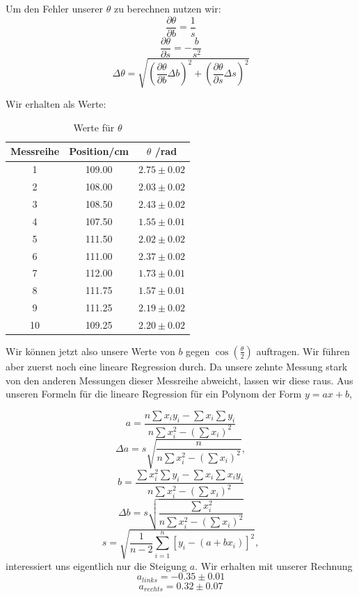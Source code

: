 \documentclass[11pt,a4paper]{article}
\begin{document}
Um den Fehler unserer $\theta$ zu berechnen nutzen wir:
\[
\frac{\partial\theta}{\partial b}=\frac{1}{s}
\]
\[
\frac{\partial\theta}{\partial s}=-\frac{b}{s^2}
\]
\[
\Delta\theta=\sqrt{\left(\frac{\partial\theta}{\partial b}\Delta b\right)^2+\left(\frac{\partial\theta}{\partial s}\Delta s\right)^2}
\]

Wir erhalten als Werte:

\begin{table}[h]
\centering
\caption{Werte f\"ur $\theta$} \vspace{11pt}
\begin{tabular}{ccc}
\toprule
\textrm{Messreihe} & \textrm{Position}/\textrm{cm} & $\theta$ /\textrm{rad} \\
\midrule 
1 & 109.00 & $2.75\pm0.02$ \\
2 & 108.00 & $2.03\pm0.02$ \\
3 & 108.50 & $2.43\pm0.02$ \\
4 & 107.50 & $1.55\pm0.01$\\
5 & 111.50 & $2.02\pm0.02$ \\
6 & 111.00 & $2.37\pm0.02$\\
7 & 112.00 & $1.73\pm0.01$ \\
8 & 111.75 & $1.57\pm0.01$ \\
9 & 111.25 & $2.19\pm0.02$ \\
10 & 109.25 & $2.20\pm0.02$ \\ 
\bottomrule
\end{tabular}
\label{Tab:2}
\end{table}

Wir k\"onnen jetzt also unsere Werte von $b$ gegen $\cos\left(\frac{\theta}{2}\right)$ auftragen. Wir f\"uhren aber zuerst noch eine lineare Regression durch. Da unsere zehnte Messung stark von den anderen Messungen dieser Messreihe abweicht, lassen wir diese raus. Aus unseren Formeln f\"ur die lineare Regression f\"ur ein Polynom der Form $y=ax+b$,

\begin{equation}
a=\frac{n\sum x_iy_i-\sum x_i\sum y_i}{n\sum x_i^2-(\sum x_i)^2}
\end{equation}
\begin{equation}
\Delta a=s\sqrt{\frac{n}{n\sum x_i^2-(\sum x_i)^2}},
\end{equation}
\begin{equation}
b=\frac{\sum x_i^2\sum y_i-\sum x_i\sum x_iy_i}{n\sum x_i^2-(\sum x_i)^2}
\end{equation}
\begin{equation}
\Delta b=s\sqrt{\frac{\sum x_i^2}{n\sum x_i^2-(\sum x_i)^2}}
\end{equation}
\begin{equation}
s=\sqrt{\frac{1}{n-2}\sum^n_{i=1}[y_i-(a+bx_i)]^2},
\end{equation}
interessiert uns eigentlich nur die Steigung $a$. Wir erhalten mit unserer Rechnung
\[a_{links}=-0.35\pm0.01\]
\[a_{rechts}=0.32\pm0.07\]
\end{document}
